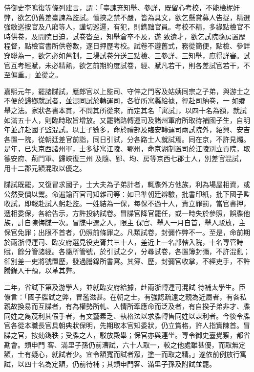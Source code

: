 \begin{pinyinscope}
 侍御史李鳴復等條列建言，謂：「臺諫充知舉、參詳，既留心考校，不能檢柅奸弊，欲乞仍舊差臺諫為監試。懷挾之禁不嚴，皆為具文，欲乞懸賞募人告捉，精選強敏巡按官及八廂等人，謹切巡邏，有犯，則鐫黜官員。考校不精，多緣點檢官不時供卷，及開院日迫，試卷沓至，知舉倉卒不及，遂
 致遺才，欲乞試院隨房置歷程督，點檢官書所供卷數，逐日押歷考校。試卷不遵舊式，務從簡便，點檢、參詳穿聯為一，欲乞必如舊制，三場試卷分送三點檢、三參詳、三知舉，庶得詳審。試官互考經賦，未必精熟，欲乞前期約度試卷，經、賦凡若干，則各差試官若干，不至偏重。」並從之。



 嘉熙元年，罷諸牒試，應郎官以上監司、守倅之門客及姑姨同宗之子弟，與游士之不便於歸鄉就試者，並混同試於轉運司，各從所寓縣給據，徑赴司納卷，一
 如鄉舉之法。家狀各書本貫，不問其所從來，而定其名「寓試」，以四十名為額，就試如滿五十人，則臨時取旨增放。又罷諸路轉運司及諸州軍府所取待補國子生，自明年並許赴國子監混試。以士子數多，命於禮部及臨安轉運司兩試院外，紹興、安吉各置一院，從朝廷差官前詣，同日引試，分各路士人就試焉。同在京，不許見燭。是年，已失京西諸州軍，士多徙寓江陵、鄂州，命京湖制置司於江陵別立貢院，取德安府、荊門軍、歸峽復三州
 及隨、郢、均、房等京西七郡士人，別差官混試，用十二郡元額混取以優之。



 牒試既罷，又復冒求國子，士大夫為子弟計者，輒牒外方他族，利為場屋相資，或公然受價以鬻。命遍諭百官司知雜司等：如已準朝廷辨驗，批書印紙，批下國子監收試，即報赴試人躬赴監。一姓結為一保，每保不過十人，責立罪罰，當官書押，遞相委保，各給告示，方許投納試卷。冒牒官降官罷任，或一時失於參照，誤牒他族，計自陳悔牒一次。冒牒中選之人，限主
 保官、舉人一月自首，舉人駁放，主保官免罪；出限不首者，仍照前條罪之。凡類試卷，封彌作弊不一。至是，命前期於兩浙轉運司、臨安府選見役吏胥共三十人，差近上一名部轄入院，十名專管詩賦，餘分管諸經。各隨所管號，於引試之夕，分尋試卷，各置簿封彌，不許混亂；卻別差一吏將號置歷，發過謄錄所書寫。其簿、歷，封彌官收掌，不經吏手，不許謄錄人干預，以革其弊。



 二年，省試下第及游學人，並就臨安府給據，赴兩浙轉運司混試
 待補太學生。臣僚言：「國子牒試之弊，冒濫滋甚。在朝之士，有強認疏遠之親為近屬者，有各私親故換易而互牒者，有為權勢所軋、人情所牽應命而泛及者，有自揆子弟非才、牒同姓之雋茂利其假手者，有文藝素乏、執格法以求牒轉售同姓以謀利者。今後令牒官各從本職長官具朝典狀保明，先期取本官知委狀，仍立賞格，許人指實陳首。冒牒之官，按劾鐫秩；受牒之人，駁放殿舉；保官亦與連坐。專令御史臺覺察，都省勘會。類申門
 客、滿里子孫仍前漕試，六十人取一，較之他處雖甚優，而取無定額，士有疑心，就試者少。宜令額寬而試者眾，塗一而取之精。」遂依前例放行寓試，以四十名為定額，仍前待補；其類申門客、滿里子孫及附試並罷。




\end{pinyinscope}

